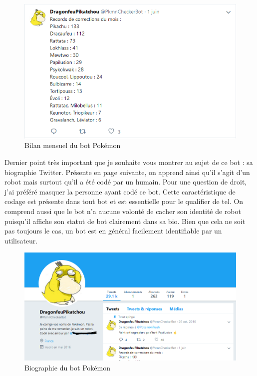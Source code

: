 \documentclass[12pt]{report}
\begin{document}
\begin{figure}[h]
    \includegraphics[width=180mm]{BotTwitterPokemon3.PNG}
    \caption{Bilan mensuel du bot Pokémon}
\label{fig:Bilan mensuel du bot Pokémon}
  \end{figure}
  
\newpage
Dernier point très important que je souhaite vous montrer au sujet de ce bot : sa biographie Twitter. Présente en page suivante, on apprend ainsi qu'il s'agit d'un robot mais surtout qu'il a été codé par un humain. Pour une question de droit, j'ai préféré masquer la personne ayant codé ce bot. Cette caractéristique de codage est présente dans tout bot et est essentielle pour le qualifier de tel. On comprend aussi que le bot n'a aucune volonté de cacher son identité de robot puisqu'il affiche son statut de bot clairement dans sa bio. Bien que cela ne soit pas toujours le cas, un bot est en général facilement identifiable par un utilisateur.

\begin{figure}[h]
    \includegraphics[width=220mm]{BotTwitterPokemon.PNG}
    \caption{Biographie du bot Pokémon}
\label{fig:Biographie du bot Pokémon}
  \end{figure}
  
\end{document}
